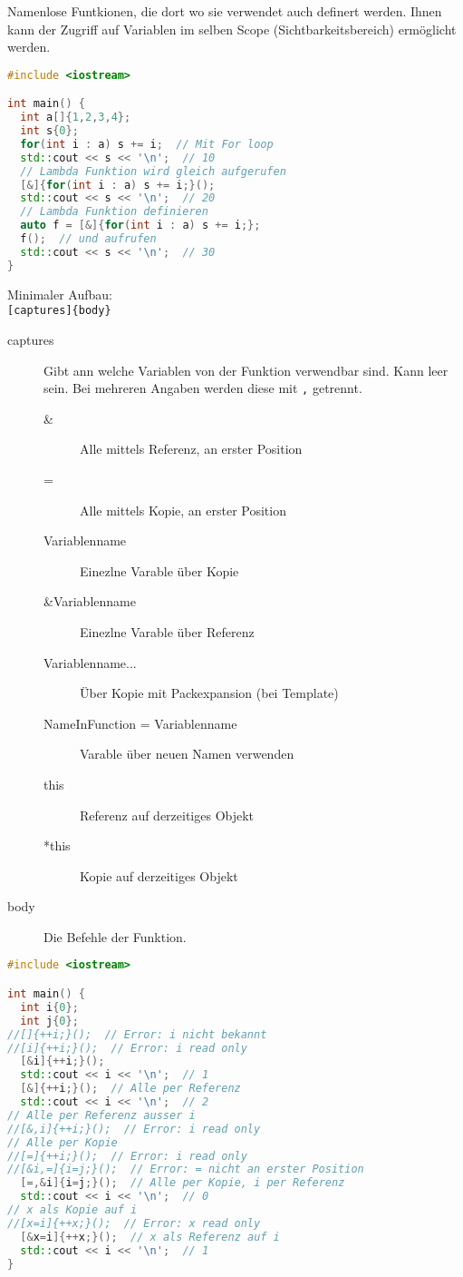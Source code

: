 Namenlose Funtkionen, die dort wo sie verwendet auch definert werden. Ihnen kann
der Zugriff auf Variablen im selben Scope (Sichtbarkeitsbereich) ermöglicht
werden.

\begin{lstlisting}[language=C++]
#include <iostream>

int main() {
  int a[]{1,2,3,4};
  int s{0};
  for(int i : a) s += i;  // Mit For loop
  std::cout << s << '\n';  // 10
  // Lambda Funktion wird gleich aufgerufen
  [&]{for(int i : a) s += i;}();
  std::cout << s << '\n';  // 20
  // Lambda Funktion definieren
  auto f = [&]{for(int i : a) s += i;};
  f();  // und aufrufen
  std::cout << s << '\n';  // 30
}
\end{lstlisting}

Minimaler Aufbau:\\
\lstinline|[captures]{body}|\\
\begin{description}
  \item[captures] Gibt ann welche Variablen von der Funktion verwendbar sind. Kann leer sein. Bei mehreren Angaben werden diese mit \lstinline|,| getrennt.
  \begin{description}
    \item[\&] Alle mittels Referenz, an erster Position
    \item[=] Alle mittels Kopie, an erster Position
    \item[Variablenname] Einezlne Varable über Kopie
    \item[\&Variablenname] Einezlne Varable über Referenz
    \item[Variablenname...] Über Kopie mit Packexpansion (bei Template)
    \item[NameInFunction = Variablenname] Varable über neuen Namen verwenden
    \item[this] Referenz auf derzeitiges Objekt
    \item[*this] Kopie auf derzeitiges Objekt
  \end{description}
  \item[body] Die Befehle der Funktion.
\end{description}

\begin{lstlisting}[language=C++]
#include <iostream>

int main() {
  int i{0};
  int j{0};
//[]{++i;}();  // Error: i nicht bekannt
//[i]{++i;}();  // Error: i read only
  [&i]{++i;}();
  std::cout << i << '\n';  // 1
  [&]{++i;}();  // Alle per Referenz
  std::cout << i << '\n';  // 2
// Alle per Referenz ausser i
//[&,i]{++i;}();  // Error: i read only
// Alle per Kopie
//[=]{++i;}();  // Error: i read only
//[&i,=]{i=j;}();  // Error: = nicht an erster Position
  [=,&i]{i=j;}();  // Alle per Kopie, i per Referenz
  std::cout << i << '\n';  // 0
// x als Kopie auf i
//[x=i]{++x;}();  // Error: x read only
  [&x=i]{++x;}();  // x als Referenz auf i
  std::cout << i << '\n';  // 1
}
\end{lstlisting}

